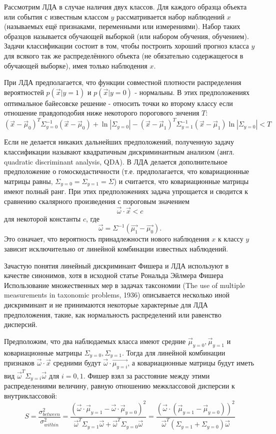 Рассмотрим ЛДА в случае наличия двух классов. Для каждого образца объекта или
события с известным классом $y$ рассматривается набор наблюдений $x$ (называемых
ещё признаками, переменными или измерениями). Набор таких образцов называется
обучающей выборкой (или набором обучения, обучением). Задачи классификации
состоит в том, чтобы построить хороший прогноз класса $y$ для всякого так же
распределённого объекта (не обязательно содержащегося в обучающей выборке), имея
только наблюдения $x$.


При ЛДА предполагается, что функции совместной плотности распределения
вероятностей $p(\vec{x}|y=1)$ и $p(\vec{x}|y=0)$ - нормальны. В этих
предположениях оптимальное байесовске решение - относить точки ко второму классу
если отношение правдоподобия ниже некоторого порогового знчения $T$:
$$ (\vec{x}-\vec{\mu}_0)^T\Sigma_{y=0}^{-1}(\vec{x}-\vec{\mu}_0)+\ln{|\Sigma _{y=0}|}-(\vec{x}-\vec{\mu}_1)^T\Sigma_{y=1}^{-1}(\vec{x}-\vec{\mu}_1)\ln{|\Sigma_{y=0}|}<T $$


Если не делается никаких дальнейших предположений, полученную задачу
классификации называют квадратичным дискриминантным анализом (англ. quadratic
discriminant analysis, QDA). В ЛДА делается дополнительное предположение о
гомоскедастичности (т.е. предполагается, что ковариационные матрицы равны,
$\Sigma_{y=0}=\Sigma_{y=1}=\Sigma$) и считается, что ковариационные матрицы
имеют полный ранг. При этих предположениях задача упрощается и сводится к
сравнению скалярного произведения с пороговым значением
$$ \vec{\omega}\cdot\vec{x}<c $$
для некоторой константы $c$, где 
$$ \vec{\omega}=\Sigma^{-1}(\vec{\mu_1}-\vec{\mu_0}). $$
Это означает, что вероятность принадлежности нового наблюдения $x$ к классу $y$
зависит исключительно от линейной комбинации известных наблюдений.


Зачастую понятия линейный дискриминант Фишера и ЛДА используют в качестве
синонимов, хотя в исходной статье Рональда Эйлмера Фишера Использование
множественных мер в задачах таксономии (The use of multiple measurements in
taxonomic problems, 1936) описывается несколько иной дискриминант и не
принимаются некоторые характерные для ЛДА предположения, такие, как нормальность
распределений или равенство дисперсий.


Предположим, что два наблюдаемых класса имеют средние
$\vec{\mu}_{y=0},\vec{\mu}_{y=1}$ и ковариационные матрицы
$\Sigma_{y=0},\Sigma_{y=1}$. Тогда для линейной комбинации признаков
$\vec{\omega}\cdot\vec{x}$ средними будут $\vec{\omega}\cdot\vec{\mu_{y=i}}$, а
ковариационные матрицы будут иметь вид $\vec{\omega}^T\Sigma_{y=i}\vec{\omega}$
для $i=0,1$. Фишер взял за расстояние между этими распределениями величину,
равную отношению межклассовой дисперсии к внутриклассовой:
$$S=\frac{\sigma^2_{between}}{\sigma^2_{within}}=\frac{(\vec{\omega}\cdot\vec{\mu}_{y=1}-\vec{\omega}\cdot\vec{\mu}_{y=0})^2}{\vec{\omega}^T\Sigma_{y=1}\vec{\omega}+\vec{\omega}^T\Sigma_{y=0}\vec{\omega}}=\frac{(\vec{\omega}\cdot(\vec{\mu}_{y=1}-\vec{\mu}_{y=0}))^2}{\vec{\omega}^T(\Sigma_{y=1}+\Sigma_{y=0})\vec{\omega}}
$$

